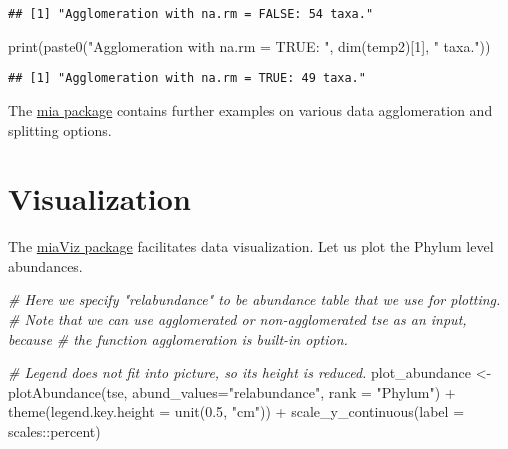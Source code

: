 \documentclass[
  oneside]{book}
\newenvironment{Shaded}{\begin{snugshade}}{\end{snugshade}}
\newcommand{\AttributeTok}[1]{\textcolor[rgb]{0.77,0.63,0.00}{#1}}
\newcommand{\CommentTok}[1]{\textcolor[rgb]{0.56,0.35,0.01}{\textit{#1}}}
\newcommand{\DecValTok}[1]{\textcolor[rgb]{0.00,0.00,0.81}{#1}}
\newcommand{\FloatTok}[1]{\textcolor[rgb]{0.00,0.00,0.81}{#1}}
\newcommand{\FunctionTok}[1]{\textcolor[rgb]{0.00,0.00,0.00}{#1}}
\newcommand{\NormalTok}[1]{#1}
\newcommand{\OtherTok}[1]{\textcolor[rgb]{0.56,0.35,0.01}{#1}}
\newcommand{\SpecialCharTok}[1]{\textcolor[rgb]{0.00,0.00,0.00}{#1}}
\newcommand{\StringTok}[1]{\textcolor[rgb]{0.31,0.60,0.02}{#1}}
\begin{document}
\begin{verbatim}
## [1] "Agglomeration with na.rm = FALSE: 54 taxa."
\end{verbatim}

\begin{Shaded}
\begin{Highlighting}[]
\FunctionTok{print}\NormalTok{(}\FunctionTok{paste0}\NormalTok{(}\StringTok{"Agglomeration with na.rm = TRUE: "}\NormalTok{, }\FunctionTok{dim}\NormalTok{(temp2)[}\DecValTok{1}\NormalTok{], }\StringTok{" taxa."}\NormalTok{))}
\end{Highlighting}
\end{Shaded}

\begin{verbatim}
## [1] "Agglomeration with na.rm = TRUE: 49 taxa."
\end{verbatim}

The \href{https://microbiome.github.io/mia/reference/index.html}{mia
package}
contains further examples on various data agglomeration and splitting
options.

\hypertarget{visualization}{%
\section{Visualization}\label{visualization}}

The \href{https://microbiome.github.io/miaViz/}{miaViz package} facilitates
data visualization. Let us plot the Phylum level abundances.

\begin{Shaded}
\begin{Highlighting}[]
\CommentTok{\# Here we specify "relabundance" to be abundance table that we use for plotting.}
\CommentTok{\# Note that we can use agglomerated or non{-}agglomerated tse as an input, because}
\CommentTok{\# the function agglomeration is built{-}in option. }

\CommentTok{\# Legend does not fit into picture, so its height is reduced.}
\NormalTok{plot\_abundance }\OtherTok{\textless{}{-}} \FunctionTok{plotAbundance}\NormalTok{(tse, }\AttributeTok{abund\_values=}\StringTok{"relabundance"}\NormalTok{, }\AttributeTok{rank =} \StringTok{"Phylum"}\NormalTok{) }\SpecialCharTok{+}
  \FunctionTok{theme}\NormalTok{(}\AttributeTok{legend.key.height =} \FunctionTok{unit}\NormalTok{(}\FloatTok{0.5}\NormalTok{, }\StringTok{"cm"}\NormalTok{)) }\SpecialCharTok{+}
  \FunctionTok{scale\_y\_continuous}\NormalTok{(}\AttributeTok{label =}\NormalTok{ scales}\SpecialCharTok{::}\NormalTok{percent)}
\end{Highlighting}
\end{Shaded}
\end{document}
